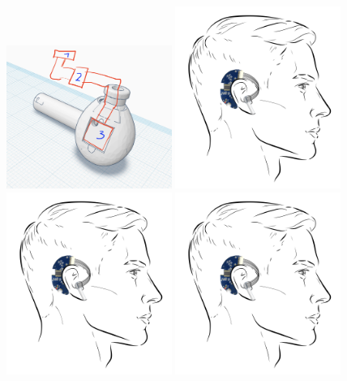 \begin{figure}[!h]
    \centering
    \includegraphics[width=0.48\textwidth]{thesis-doc/images/prototype/flex_pcb_design_finding.png}
    \includegraphics[width=0.48\textwidth]{thesis-doc/images/prototype/prototype_on_head_visual.png}
    \includegraphics[width=0.48\textwidth]{thesis-doc/images/prototype/prototype_on_head_visual.png}
    \includegraphics[width=0.48\textwidth]{thesis-doc/images/prototype/prototype_on_head_visual.png}

\end{figure}
